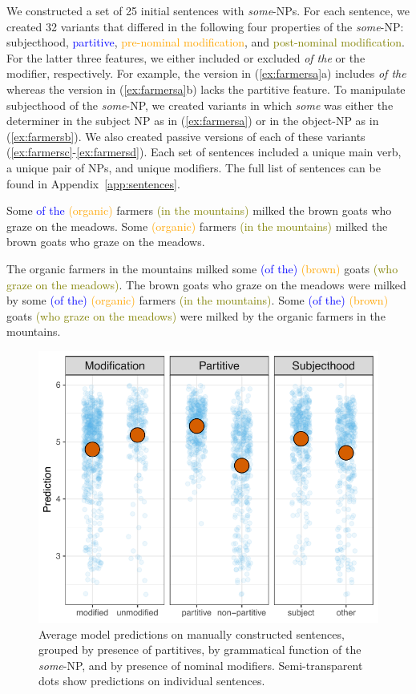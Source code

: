 \documentclass[11pt,a4paper]{article}
\newcommand{\prtt}[1]{\textcolor{blue}{(#1)}}
\newcommand{\prmod}[1]{\textcolor{orange}{(#1)}}
\newcommand{\pomod}[1]{\textcolor{olive}{(#1)}}
\begin{document}
We constructed a set of 25 initial sentences with \emph{some}-NPs. For each sentence, we created 32 variants that differed in the following four properties of the \emph{some}-NP: subjecthood, \textcolor{blue}{partitive}, \textcolor{orange}{pre-nominal modification}, and \textcolor{olive}{post-nominal modification}. For the latter three features, we either included or excluded \emph{of the} or the modifier, respectively. For example, the version in  (\ref{ex:farmersa}a) includes \emph{of the} whereas the version in  (\ref{ex:farmersa}b)  lacks the partitive feature. To manipulate subjecthood of the \emph{some}-NP, we created variants in which \emph{some} was either the determiner in the subject NP as in (\ref{ex:farmersa}) or in the object-NP as in (\ref{ex:farmersb}). We also created passive versions of each of these variants (\ref{ex:farmersc}-\ref{ex:farmersd}). Each set of sentences included
a unique main verb, a unique pair of NPs, and unique modifiers.
The full list of sentences can be found in Appendix~\ref{app:sentences}.

\begin{exe}
\small
        \ex     \label{ex:farmersa}
          \begin{xlist} \ex Some \textcolor{blue}{of the} \prmod{organic} farmers \pomod{in the mountains} milked the brown goats who graze on the meadows.
          \ex Some \prmod{organic} farmers \pomod{in the mountains} milked the brown goats who graze on the meadows.
            \end{xlist}
        
        \ex  \label{ex:farmersb} The organic farmers in the mountains milked some \prtt{of the} \prmod{brown} goats \pomod{who graze on the meadows}.
        \ex \label{ex:farmersc} The brown goats who graze on the meadows were milked by some \prtt{of the} \prmod{organic} farmers \pomod{in the mountains}.
        \ex \label{ex:farmersd} Some \prtt{of the} \prmod{brown} goats \pomod{who graze on the meadows} were milked by the organic farmers in the mountains.

\end{exe}

\begin{figure}[t]
	\includegraphics[width=.49\textwidth]{./images/800-qualitative.pdf}
	\caption{Average model predictions on manually constructed sentences, grouped by presence of partitives, by grammatical function of the \emph{some}-NP, and by presence of nominal modifiers.  Semi-transparent dots show predictions on individual sentences.}
	\label{fig:minimal-pairs}
\end{figure}
\end{document}
